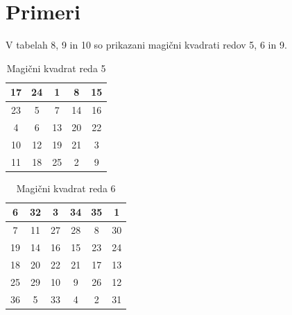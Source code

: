 \documentclass[a4paper,12pt]{article}
\theoremstyle{definition}
\theoremstyle{plain}
\begin{document}

\section{Primeri}

V tabelah 8, 9 in 10 so prikazani
magični kvadrati redov 5, 6 in 9.

\begin{table}[!ht]
   \centering
   \caption{Magični kvadrat reda 5}
   \label{table:mag5}
   \begin{tabular}{|c|c|c|c|c|}
       \hline
       17 & 24 &  1 &  8 & 15 \\\hline
       23 &  5 &  7 & 14 & 16 \\\hline
        4 &  6 & 13 & 20 & 22 \\\hline
       10 & 12 & 19 & 21 &  3 \\\hline
       11 & 18 & 25 &  2 &  9 \\\hline
   \end{tabular}
\end{table}

\begin{table}[!ht]
   \centering
   \caption{Magični kvadrat reda 6}
   \label{table:mag6}
   \begin{tabular}{|c|c|c|c|c|c|}
       \hline
        6 & 32 &  3 & 34 & 35 &  1 \\\hline
        7 & 11 & 27 & 28 &  8 & 30 \\\hline
       19 & 14 & 16 & 15 & 23 & 24 \\\hline
       18 & 20 & 22 & 21 & 17 & 13 \\\hline
       25 & 29 & 10 &  9 & 26 & 12 \\\hline
       36 &  5 & 33 &  4 &  2 & 31 \\\hline
   \end{tabular}
\end{table}
\end{document}
